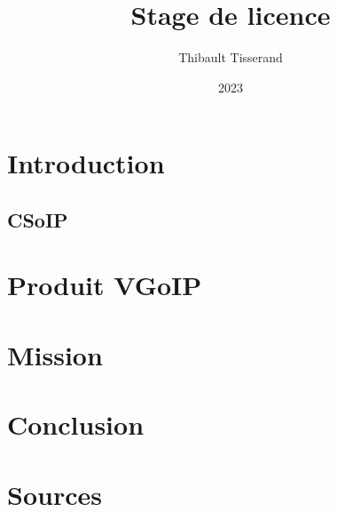 \documentclass{beamer}
\title{Stage de licence}
\author{Thibault Tisserand}
\institute{Université de Lille}
\date{2023}
\begin{document}
\titlepage



\section{Introduction}


\subsection{CSoIP}


\section{Produit VGoIP}


\section{Mission}


\section{Conclusion}


\section{Sources}

\end{document}
